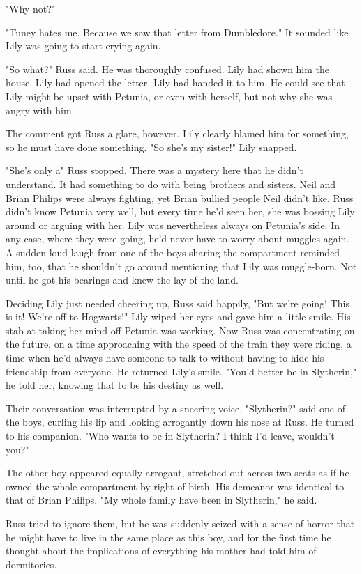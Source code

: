 "Why not?"

"Tuney h{\el}ates me. Because we saw that letter from Dumbledore." It sounded like Lily was going to start crying again.

"So what?" Russ said. He was thoroughly confused. Lily had shown him the house, Lily had opened the letter, Lily had handed it to him. He could see that Lily might be upset with Petunia, or even with herself, but not why she was angry with him.

The comment got Russ a glare, however. Lily clearly blamed him for something, so he must have done something. "So she's my sister!" Lily snapped.

"She's only a{\el}" Russ stopped. There was a mystery here that he didn't understand. It had something to do with being brothers and sisters. Neil and Brian Philips were always fighting, yet Brian bullied people Neil didn't like. Russ didn't know Petunia very well, but every time he'd seen her, she was bossing Lily around or arguing with her. Lily was nevertheless always on Petunia's side. In any case, where they were going, he'd never have to worry about muggles again. A sudden loud laugh from one of the boys sharing the compartment reminded him, too, that he shouldn't go around mentioning that Lily was muggle-born. Not until he got his bearings and knew the lay of the land.

Deciding Lily just needed cheering up, Russ said happily, "But we're going! This is it! We're off to Hogwarts!" Lily wiped her eyes and gave him a little smile. His stab at taking her mind off Petunia was working. Now Russ was concentrating on the future, on a time approaching with the speed of the train they were riding, a time when he'd always have someone to talk to without having to hide his friendship from everyone. He returned Lily's smile. "You'd better be in Slytherin," he told her, knowing that to be his destiny as well.

Their conversation was interrupted by a sneering voice. "Slytherin?" said one of the boys, curling his lip and looking arrogantly down his nose at Russ. He turned to his companion. "Who wants to be in Slytherin? I think I'd leave, wouldn't you?"

The other boy appeared equally arrogant, stretched out across two seats as if he owned the whole compartment by right of birth. His demeanor was identical to that of Brian Philips. "My whole family have been in Slytherin," he said.

Russ tried to ignore them, but he was suddenly seized with a sense of horror that he might have to live in the same place as this boy, and for the first time he thought about the implications of everything his mother had told him of dormitories.

